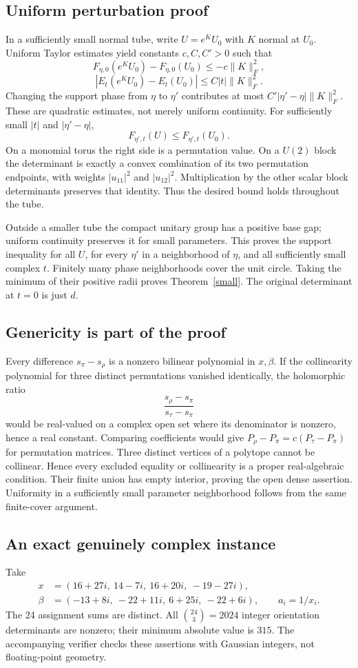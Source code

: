 \documentclass[11pt]{article}
\begin{document}
\subsection{Uniform perturbation proof}
In a sufficiently small normal tube, write $U=e^KU_0$ with $K$ normal at $U_0$. Uniform Taylor estimates yield constants $c,C,C'>0$ such that
\[
F_{\eta,0}(e^KU_0)-F_{\eta,0}(U_0)\le-c\|K\|_F^2,
\]
\[
|E_t(e^KU_0)-E_t(U_0)|\le C|t|\|K\|_F^2.
\]
Changing the support phase from $\eta$ to $\eta'$ contributes at most $C'|\eta'-\eta|\|K\|_F^2$. These are quadratic estimates, not merely uniform continuity. For sufficiently small $|t|$ and $|\eta'-\eta|$,
\[
F_{\eta',t}(U)\le F_{\eta',t}(U_0).
\]
On a monomial torus the right side is a permutation value. On a $U(2)$ block the determinant is exactly a convex combination of its two permutation endpoints, with weights $|u_{11}|^2$ and $|u_{12}|^2$. Multiplication by the other scalar block determinants preserves that identity. Thus the desired bound holds throughout the tube.

Outside a smaller tube the compact unitary group has a positive base gap; uniform continuity preserves it for small parameters. This proves the support inequality for all $U$, for every $\eta'$ in a neighborhood of $\eta$, and all sufficiently small complex $t$. Finitely many phase neighborhoods cover the unit circle. Taking the minimum of their positive radii proves Theorem~\ref{small}. The original determinant at $t=0$ is just $d$.

\subsection{Genericity is part of the proof}
Every difference $s_\pi-s_\rho$ is a nonzero bilinear polynomial in $x,\beta$. If the collinearity polynomial for three distinct permutations vanished identically, the holomorphic ratio
\[
\frac{s_\rho-s_\pi}{s_\tau-s_\pi}
\]
would be real-valued on a complex open set where its denominator is nonzero, hence a real constant. Comparing coefficients would give
$P_\rho-P_\pi=c(P_\tau-P_\pi)$ for permutation matrices. Three distinct vertices of a polytope cannot be collinear. Hence every excluded equality or collinearity is a proper real-algebraic condition. Their finite union has empty interior, proving the open dense assertion. Uniformity in a sufficiently small parameter neighborhood follows from the same finite-cover argument.

\subsection{An exact genuinely complex instance}
Take
\begin{align*}
x&=(16+27i,\ 14-7i,\ 16+20i,\ -19-27i),\\
\beta&=(-13+8i,\ -22+11i,\ 6+25i,\ -22+6i),\qquad a_i=1/x_i.
\end{align*}
The 24 assignment sums are distinct. All $\binom{24}{3}=2024$ integer orientation determinants are nonzero; their minimum absolute value is $315$. The accompanying verifier checks these assertions with Gaussian integers, not floating-point geometry.

\end{document}
